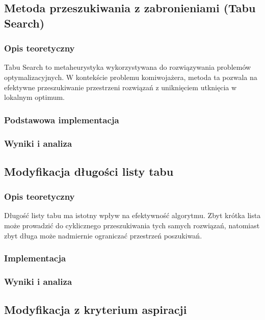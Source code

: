 \documentclass[12pt,a4paper]{article}
\begin{document}
\subsection{Metoda przeszukiwania z zabronieniami (Tabu Search)}
\subsubsection{Opis teoretyczny}
Tabu Search to metaheurystyka wykorzystywana do rozwiązywania problemów optymalizacyjnych. W kontekście problemu komiwojażera, metoda ta pozwala na efektywne przeszukiwanie przestrzeni rozwiązań z uniknięciem utknięcia w lokalnym optimum.

\subsubsection{Podstawowa implementacja}

\subsubsection{Wyniki i analiza}

\subsection{Modyfikacja długości listy tabu}
\subsubsection{Opis teoretyczny}
Długość listy tabu ma istotny wpływ na efektywność algorytmu. Zbyt krótka lista może prowadzić do cyklicznego przeszukiwania tych samych rozwiązań, natomiast zbyt długa może nadmiernie ograniczać przestrzeń poszukiwań.

\subsubsection{Implementacja}

\subsubsection{Wyniki i analiza}

\subsection{Modyfikacja z kryterium aspiracji}
\end{document}

